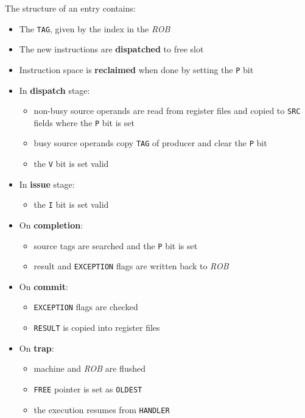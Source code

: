 \documentclass[english]{article}
\begin{document}
\begin{minipage}{\textwidth}
  \bigskip
  The structure of an entry contains:

  \begin{itemize}
    \item The \texttt{TAG}, given by the index in the \textit{ROB}
    \item The new instructions are \textbf{dispatched} to free slot
    \item Instruction space is \textbf{reclaimed} when done by setting the \texttt{P} bit
    \item In \textbf{dispatch} stage:
          \begin{itemize}
            \item non-busy source operands are read from register files and copied to \texttt{SRC} fields where the \texttt{P} bit is set
            \item busy source operands copy \texttt{TAG} of producer and clear the \texttt{P} bit
            \item the \texttt{V} bit is set valid
          \end{itemize}
    \item In \textbf{issue} stage:
          \begin{itemize}
            \item the \texttt{I} bit is set valid
          \end{itemize}
    \item On \textbf{completion}:
          \begin{itemize}
            \item source tags are searched and the \texttt{P} bit is set
            \item result and \texttt{EXCEPTION} flags are written back to \textit{ROB}
          \end{itemize}
    \item On \textbf{commit}:
          \begin{itemize}
            \item \texttt{EXCEPTION} flags are checked
            \item \texttt{RESULT} is copied into register files
          \end{itemize}
    \item On \textbf{trap}:
          \begin{itemize}
            \item machine and \textit{ROB} are flushed
            \item \texttt{FREE} pointer is set as \texttt{OLDEST}
            \item the execution resumes from \texttt{HANDLER}
          \end{itemize}
  \end{itemize}
\end{minipage}
\end{document}

